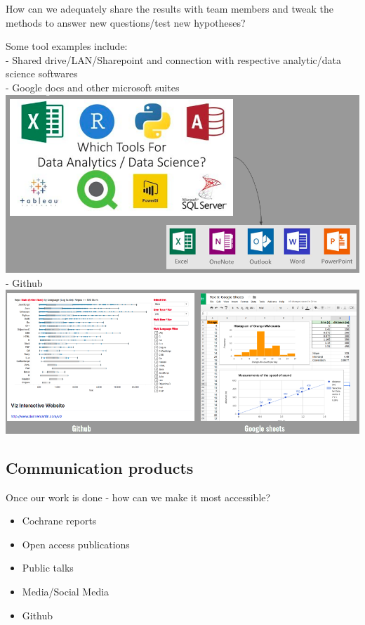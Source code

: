 \documentclass[
  12pt,
]{book}
\providecommand{\tightlist}{%
  \setlength{\itemsep}{0pt}\setlength{\parskip}{0pt}}
\begin{document}
How can we adequately share the results with team members and tweak the methods to answer new questions/test new hypotheses?

Some tool examples include:\\
- Shared drive/LAN/Sharepoint and connection with respective analytic/data science softwares\\
- Google docs and other microsoft suites\\
\includegraphics{rr-presentation-figure/results1.png}
- Github\\
\includegraphics{rr-presentation-figure/results2.png}

\hypertarget{communication-products}{%
\subsection{Communication products}\label{communication-products}}

Once our work is done - how can we make it most accessible?

\begin{itemize}
\tightlist
\item
  Cochrane reports\\
\item
  Open access publications\\
\item
  Public talks\\
\item
  Media/Social Media\\
\item
  Github
\end{itemize}
\end{document}
